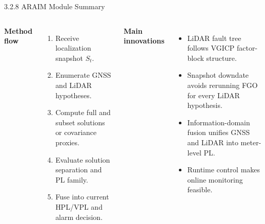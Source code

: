 \documentclass[10pt,aspectratio=169,xcolor=dvipsnames]{beamer}
\begin{document}
\begin{frame}{3.2.8 ARAIM Module Summary}
  \small
  \begin{columns}[T]
    \textbf{Method flow}
    \begin{enumerate}\footnotesize
      \item Receive localization snapshot $S_t$.
      \item Enumerate GNSS and LiDAR hypotheses.
      \item Compute full and subset solutions or covariance proxies.
      \item Evaluate solution separation and PL family.
      \item Fuse into current HPL/VPL and alarm decision.
    \end{enumerate}

    \textbf{Main innovations}
    \begin{itemize}\footnotesize
      \item LiDAR fault tree follows VGICP factor-block structure.
      \item Snapshot downdate avoids rerunning FGO for every LiDAR hypothesis.
      \item Information-domain fusion unifies GNSS and LiDAR into meter-level PL.
      \item Runtime control makes online monitoring feasible.
    \end{itemize}
  \end{columns}
\end{frame}

\end{document}
